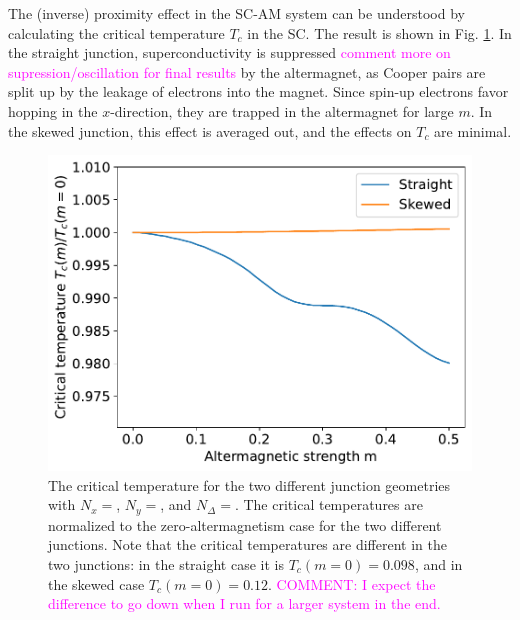 \documentclass[aps,twocolumn,amsmath,amssymb,preprintnumbers,floatfix,prl,superscriptaddress,longbibliography]{revtex4-2}%
\newcommand{\hans}[1]{\textcolor{Magenta}{{#1}}}
\begin{document}
The (inverse) proximity effect in the SC-AM system can be understood by calculating the critical temperature $T_c$ in the SC. The result is shown in Fig. \ref{fig:geometry}. In the straight junction, superconductivity is suppressed \hans{comment more on supression/oscillation for final results} by the altermagnet, as Cooper pairs are split up by the leakage of electrons into the magnet. Since spin-up electrons favor hopping in the $x$-direction, they are trapped in the altermagnet for large $m$. In the skewed junction, this effect is averaged out, and the effects on $T_c$ are minimal. 
\begin{figure}[htb]
    \centering
    \includegraphics[width = 0.7 \linewidth]{plots_maintext/geometry.pdf}
    \caption{ The critical temperature for the two different junction geometries with $N_x = $, $N_y = $, and $N_\Delta = $.
    The critical temperatures are normalized to the zero-altermagnetism case for the two different junctions. Note that the critical temperatures are different in the two junctions: in the straight case it is $T_c(m = 0) = 0.098$, and in the skewed case $T_c(m = 0) = 0.12$. \hans{COMMENT: I expect the difference to go down when I run for a larger system in the end.}}
    \label{fig:geometry}
\end{figure}
\end{document}
